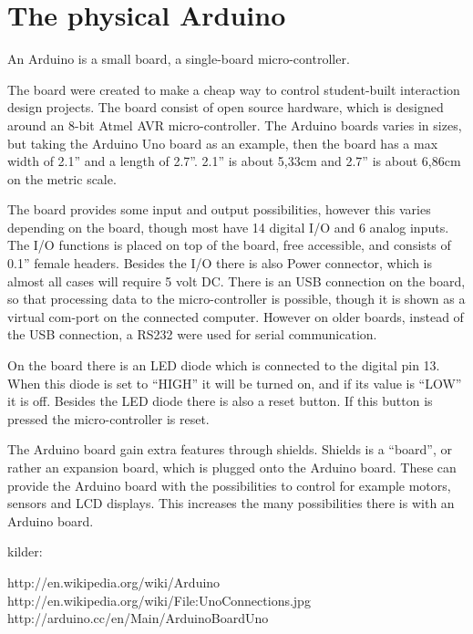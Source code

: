 
\section{The physical Arduino}
An Arduino is a small board, a single-board micro-controller.

The board were created to make a cheap way to control student-built interaction design projects. The board consist of open source hardware, which is designed around an 8-bit Atmel AVR micro-controller. The Arduino boards varies in sizes, but taking the Arduino Uno board as an example, then the board has a max width of 2.1'' and a length of 2.7''. 2.1'' is about 5,33cm and 2.7'' is about 6,86cm on the metric scale. 

The board provides some input and output possibilities, however this varies depending on the board, though most have 14 digital I/O and 6 analog inputs. The I/O functions is placed on top of the board, free accessible, and consists of 0.1'' female headers. Besides the I/O there is also Power connector, which is almost all cases will require 5 volt DC. There is an USB connection on the board, so that processing data to the micro-controller is possible, though it is shown as a virtual com-port on the connected computer. However on older boards, instead of the USB connection, a RS232 were used for serial communication. 

On the board there is an LED diode which is connected to the digital pin 13. When this diode is set to ``HIGH'' it will be turned on, and if its value is ``LOW'' it is off. Besides the LED diode there is also a reset button. If this button is pressed the micro-controller is reset. 

The Arduino board gain extra features through shields. Shields is a ``board'', or rather an expansion board, which is plugged onto the Arduino board. These can provide the Arduino board with the possibilities to control for example motors, sensors and LCD displays. This increases the many possibilities there is with an Arduino board. 

kilder:

http://en.wikipedia.org/wiki/Arduino
http://en.wikipedia.org/wiki/File:UnoConnections.jpg
http://arduino.cc/en/Main/ArduinoBoardUno

